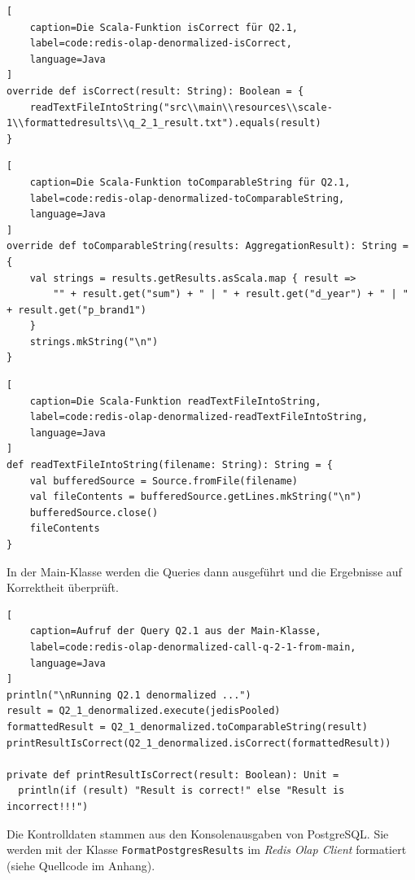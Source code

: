 \begin{lstlisting}[
    caption=Die Scala-Funktion isCorrect für Q2.1,
    label=code:redis-olap-denormalized-isCorrect,
    language=Java
]
override def isCorrect(result: String): Boolean = {
	readTextFileIntoString("src\\main\\resources\\scale-1\\formattedresults\\q_2_1_result.txt").equals(result)
}
\end{lstlisting}

\begin{lstlisting}[
    caption=Die Scala-Funktion toComparableString für Q2.1,
    label=code:redis-olap-denormalized-toComparableString,
    language=Java
]
override def toComparableString(results: AggregationResult): String = {
	val strings = results.getResults.asScala.map { result =>
		"" + result.get("sum") + " | " + result.get("d_year") + " | " + result.get("p_brand1")
	}
	strings.mkString("\n")
}
\end{lstlisting}

\begin{lstlisting}[
    caption=Die Scala-Funktion readTextFileIntoString,
    label=code:redis-olap-denormalized-readTextFileIntoString,
    language=Java
]
def readTextFileIntoString(filename: String): String = {
	val bufferedSource = Source.fromFile(filename)
	val fileContents = bufferedSource.getLines.mkString("\n")
	bufferedSource.close()
	fileContents
}
\end{lstlisting}

In der Main-Klasse werden die Queries dann ausgeführt und die Ergebnisse auf Korrektheit überprüft.
\begin{lstlisting}[
    caption=Aufruf der Query Q2.1 aus der Main-Klasse,
    label=code:redis-olap-denormalized-call-q-2-1-from-main,
    language=Java
]
println("\nRunning Q2.1 denormalized ...")
result = Q2_1_denormalized.execute(jedisPooled)
formattedResult = Q2_1_denormalized.toComparableString(result)
printResultIsCorrect(Q2_1_denormalized.isCorrect(formattedResult))

private def printResultIsCorrect(result: Boolean): Unit = 
  println(if (result) "Result is correct!" else "Result is incorrect!!!")

\end{lstlisting}

Die Kontrolldaten stammen aus den Konsolenausgaben von PostgreSQL. Sie werden mit der Klasse \lstinline|FormatPostgresResults| im \emph{Redis Olap Client} formatiert (siehe Quellcode im Anhang).

